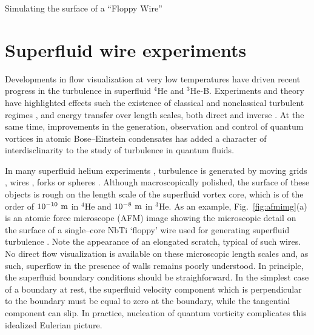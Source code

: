 \begin{chapter}{\label{cha:afm}Simulating the surface of a ``Floppy Wire''}
\section{\label{section:sfwire} Superfluid wire experiments}
Developments in flow visualization at very low temperatures
\cite{Guo2014,Fisher2014} have
driven recent progress in the turbulence in superfluid $^4$He and
$^3$He-B. Experiments and theory have highlighted effects
such the existence of classical and
nonclassical turbulent regimes \cite{WalmsleyGolov2008}, and
energy transfer over length scales, both
direct \cite{Barenghi2014} and inverse
\cite{WalmsleyTompsett2013,Baggaley2014}.
At the same time, improvements in the generation, observation and control of quantum
vortices in atomic Bose--Einstein condensates\cite{Henn2009,Freilich2010,Aioi2011,Neely2013,Kwon2014}
has added a character of interdisclinarity to the study of
turbulence in quantum fluids.

In many superfluid helium experiments \cite{VinenSkrbek2008}, turbulence
is generated by moving grids \cite{Davis2000},
wires \cite{Guenault1986,Bradley2005,Bradley2011,Fisher2001,Goto2008},
forks \cite{Blaauwgeers2007,Bradley2012} or spheres \cite{Schoepe1995}.
Although macroscopically polished, the surface of these objects is
rough on the length scale of the superfluid vortex core, which is of
the order of $10^{-10}~\rm m$ in $^4$He
and $10^{-8}~\rm m$ in $^3$He.  As an example, Fig.~\ref{fig:afmimg}(a) is an atomic force microscope (AFM) image showing the microscopic detail on the surface of a  single--core NbTi `floppy' wire used for generating superfluid turbulence  \cite{Bradley2011}.  Note the appearance of an elongated scratch, typical of such wires.  No direct flow visualization is available on these microscopic length scales and, as such, 
superflow in the presence of walls remains poorly understood. In principle, the superfluid boundary conditions should
be straighforward.
In the simplest case of a boundary at rest, the superfluid velocity
component which is perpendicular to the boundary must be equal to
zero at the boundary, while the tangential component can slip.
In practice, nucleation of quantum vorticity complicates
this idealized Eulerian picture.


\end{chapter}
